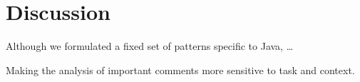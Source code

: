 \chapter{Discussion}
\label{ch:Discussion}

Although we formulated a fixed set of patterns specific to Java, \dots {}

Making the analysis of important comments more sensitive to task and context.

\endinput

Any text after an \endinput is ignored.
You could put scraps here or things in progress.